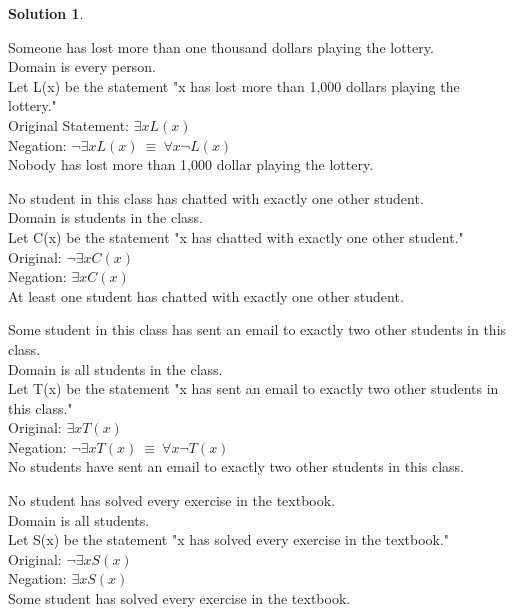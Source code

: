 \documentclass{article}
\theoremstyle{definition}
\newtheorem*{solution}{Solution}
\begin{document}
\begin{solution}\ \\
\begin{compactenum}
\item Someone has lost more than one thousand dollars playing the lottery.\ \\
Domain is every person.\ \\
Let L(x) be the statement "x has lost more than 1,000 dollars playing the lottery."\ \\
Original Statement: $\exists x L(x)$\ \\
Negation: $\neg \exists x L(x) \ \equiv \ \forall x \neg L(x)$ \ \\
Nobody has lost more than 1,000 dollar playing the lottery.
\ \\ 
\item No student in this class has chatted with exactly one other student.\ \\
Domain is students in the class.\ \\
Let C(x) be the statement "x has chatted with exactly one other student."\ \\
Original: $\neg\exists x C(x)$\ \\
Negation: $\exists x C(x)$\ \\ 
At least one student has chatted with exactly one other student.\ \\
\item  Some student in this class has sent an email to exactly two other students in this class.\ \\
Domain is all students in the class.\ \\
Let T(x) be the statement "x has sent an email to exactly two other students in this class."\ \\
Original: $\exists x T(x)$\ \\
Negation: $\neg \exists x T(x) \ \equiv \ \forall x \neg T(x)$\ \\
No students have sent an email to exactly two other students in this class.\ \\
\item No student has solved every exercise in the textbook.\ \\
Domain is all students.\ \\
Let S(x) be the statement "x has solved every exercise in the textbook."\ \\
Original: $\neg \exists x S(x)$\ \\
Negation: $\exists x S(x)$\ \\
Some student has solved every exercise in the textbook.\ \\

\end{compactenum}
\end{solution}
\end{document}
